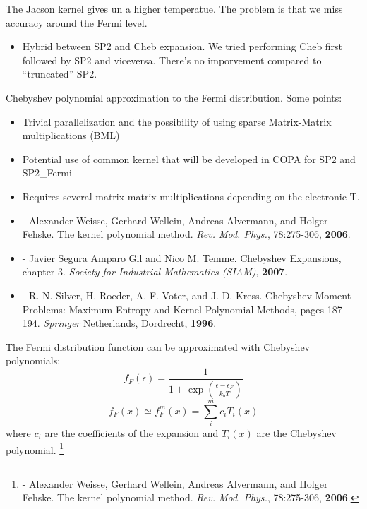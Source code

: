 
The Jacson kernel gives un a higher temperatue. The problem is that we miss accuracy around the Fermi level. 

\begin{itemize}
 \item Hybrid between SP2 and Cheb expansion. We tried performing Cheb first followed by SP2 and viceversa. There's no imporvement 
 compared to ``truncated'' SP2. 
 
\end{itemize}


Chebyshev polynomial approximation to the Fermi distribution. Some points:
\begin{itemize}
 \item Trivial parallelization and the possibility of using sparse Matrix-Matrix multiplications (BML)
 \item Potential use of common kernel that will be developed in COPA for SP2 and SP2\_Fermi
 \item Requires several matrix-matrix multiplications depending on the electronic T.  
\end{itemize}

  \begin{itemize}
   \item     - Alexander Weisse, Gerhard Wellein, Andreas Alvermann, and Holger Fehske. The kernel polynomial method. \textit{Rev. Mod. Phys.}, 78:275-306, \textbf{2006}. 
  \item     - Javier Segura Amparo Gil and Nico M. Temme. Chebyshev Expansions, chapter 3. \textit{Society for Industrial Mathematics (SIAM)}, \textbf{2007}.
  \item - R. N. Silver, H. Roeder, A. F. Voter, and J. D. Kress. Chebyshev Moment Problems: Maximum Entropy and Kernel Polynomial Methods, pages 187–194. \textit{Springer} Netherlands, Dordrecht, \textbf{1996}. 
  \end{itemize}  
  


The Fermi distribution function can be approximated with Chebyshev polynomials: 
\begin{equation}
  f_F(\epsilon)= \frac{1}{1+\exp(\frac{\epsilon-\epsilon_F}{k_bT})}
  \label{Fermi}
\end{equation}
\vspace{0.3cm}
\begin{equation}
  f_F(x) \simeq f^m_F(x) = \sum_i^m c_i T_i(x)
\end{equation}
where $c_i$ are the coefficients of the expansion and $T_i(x)$ are the Chebyshev polynomial.
  \footnote{\tiny
    - Alexander Weisse, Gerhard Wellein, Andreas Alvermann, and Holger Fehske. The kernel polynomial method. \textit{Rev. Mod. Phys.}, 78:275-306, \textbf{2006}. 
  }


